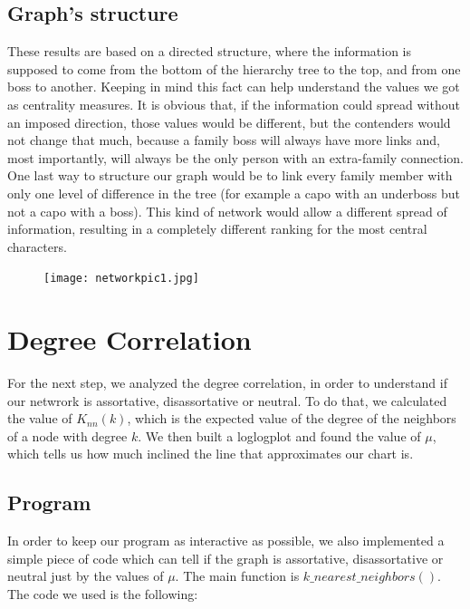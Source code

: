 \documentclass{article}
\begin{document}
\vspace{-20pt}
\textcolor{Titoli}{\subsection{Graph's structure}}
These results are based on a directed structure, where the information is supposed to come from the bottom of the hierarchy tree to the top, and from one boss to another. Keeping in mind this fact can help understand the values we got as centrality measures. It is obvious that, if the information could spread without an imposed direction, those values would be different, but the contenders would not change that much, because a family boss will always have more links and, most importantly, will always be the only person with an extra-family connection. One last way to structure our graph would be to link every family member with only one level of difference in the tree (for example a capo with an underboss but not a capo with a boss). This kind of network would allow a different spread of information, resulting in a completely different ranking for the most central characters.



\begin{figure}[t!]
\vspace{-250pt}
\centering
\texttt{[image: networkpic1.jpg]}
\advance\leftskip-3.52cm
\end{figure}



\newpage
\pagecolor{white}\afterpage{\pagecolor{Pagine}}



\section{\textcolor{Paragrafi}{Degree Correlation}}
For the next step, we analyzed the degree correlation, in order to understand if our netwrork is assortative, disassortative or neutral. To do that, we calculated the value of $K_{nn}(k)$, which is the expected value of the degree of the neighbors of a node with degree $k$. We then built a loglogplot and found the value of $\mu$, which tells us how much inclined the line that approximates our chart is. 



\textcolor{Titoli}{\subsection{Program}}
In order to keep our program as interactive as possible, we also implemented a simple piece of code which can tell if the graph is assortative, disassortative or neutral just by the values of $\mu$. The main function is $k\_nearest\_neighbors()$. The code we used is the following:
\vspace{10pt}
\end{document}

